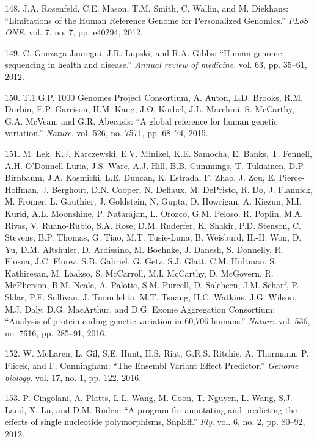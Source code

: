 \documentclass[12pt,a4paper,twoside]{ugathesis}
\theoremstyle{definition}
\theoremstyle{definition}
\theoremstyle{definition}
\theoremstyle{remark}
\begin{document}
\hypertarget{ref-Rosenfeld2012}{}
148. J.A. Rosenfeld, C.E. Mason, T.M. Smith, C. Wallin, and M. Diekhans:
``Limitations of the Human Reference Genome for Personalized Genomics.''
\emph{PLoS ONE}. vol. 7, no. 7, pp. e40294, 2012.

\hypertarget{ref-Gonzaga-Jauregui2012}{}
149. C. Gonzaga-Jauregui, J.R. Lupski, and R.A. Gibbs: ``Human genome
sequencing in health and disease.'' \emph{Annual review of medicine}.
vol. 63, pp. 35--61, 2012.

\hypertarget{ref-1000GenomesProjectConsortium2015}{}
150. T.1.G.P. 1000 Genomes Project Consortium, A. Auton, L.D. Brooks,
R.M. Durbin, E.P. Garrison, H.M. Kang, J.O. Korbel, J.L. Marchini, S.
McCarthy, G.A. McVean, and G.R. Abecasis: ``A global reference for human
genetic variation.'' \emph{Nature}. vol. 526, no. 7571, pp. 68--74,
2015.

\hypertarget{ref-Lek2016}{}
151. M. Lek, K.J. Karczewski, E.V. Minikel, K.E. Samocha, E. Banks, T.
Fennell, A.H. O'Donnell-Luria, J.S. Ware, A.J. Hill, B.B. Cummings, T.
Tukiainen, D.P. Birnbaum, J.A. Kosmicki, L.E. Duncan, K. Estrada, F.
Zhao, J. Zou, E. Pierce-Hoffman, J. Berghout, D.N. Cooper, N. Deflaux,
M. DePristo, R. Do, J. Flannick, M. Fromer, L. Gauthier, J. Goldstein,
N. Gupta, D. Howrigan, A. Kiezun, M.I. Kurki, A.L. Moonshine, P.
Natarajan, L. Orozco, G.M. Peloso, R. Poplin, M.A. Rivas, V.
Ruano-Rubio, S.A. Rose, D.M. Ruderfer, K. Shakir, P.D. Stenson, C.
Stevens, B.P. Thomas, G. Tiao, M.T. Tusie-Luna, B. Weisburd, H.-H. Won,
D. Yu, D.M. Altshuler, D. Ardissino, M. Boehnke, J. Danesh, S. Donnelly,
R. Elosua, J.C. Florez, S.B. Gabriel, G. Getz, S.J. Glatt, C.M. Hultman,
S. Kathiresan, M. Laakso, S. McCarroll, M.I. McCarthy, D. McGovern, R.
McPherson, B.M. Neale, A. Palotie, S.M. Purcell, D. Saleheen, J.M.
Scharf, P. Sklar, P.F. Sullivan, J. Tuomilehto, M.T. Tsuang, H.C.
Watkins, J.G. Wilson, M.J. Daly, D.G. MacArthur, and D.G. Exome
Aggregation Consortium: ``Analysis of protein-coding genetic variation
in 60,706 humans.'' \emph{Nature}. vol. 536, no. 7616, pp. 285--91,
2016.

\hypertarget{ref-McLaren2016}{}
152. W. McLaren, L. Gil, S.E. Hunt, H.S. Riat, G.R.S. Ritchie, A.
Thormann, P. Flicek, and F. Cunningham: ``The Ensembl Variant Effect
Predictor.'' \emph{Genome biology}. vol. 17, no. 1, pp. 122, 2016.

\hypertarget{ref-Cingolani2012}{}
153. P. Cingolani, A. Platts, L.L. Wang, M. Coon, T. Nguyen, L. Wang,
S.J. Land, X. Lu, and D.M. Ruden: ``A program for annotating and
predicting the effects of single nucleotide polymorphisms, SnpEff.''
\emph{Fly}. vol. 6, no. 2, pp. 80--92, 2012.
\end{document}
